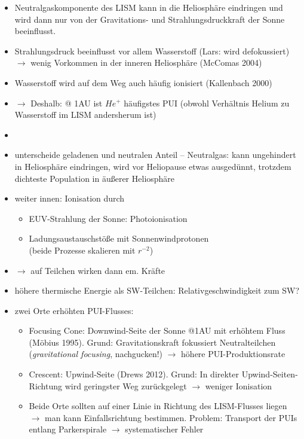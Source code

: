 \documentclass[]{article}
\begin{document}
\begin{itemize}
	\item Neutralgaskomponente des LISM kann in die Heliosphäre eindringen und wird dann nur von der Gravitations- und Strahlungsdruckkraft der Sonne beeinflusst.
	\item Strahlungsdruck beeinflusst vor allem Wasserstoff (Lars: wird defokussiert) $\rightarrow$ wenig Vorkommen in der inneren Heliosphäre (McComas 2004)
	\item Wasserstoff wird auf dem Weg auch häufig ionisiert (Kallenbach 2000)
	\item $\rightarrow$ Deshalb: @ 1AU ist $He^+$ häufigstes PUI (obwohl Verhältnis Helium zu Wasserstoff im LISM andersherum ist)
	\item
	\item unterscheide geladenen und neutralen Anteil -- Neutralgas: kann ungehindert in Heliosphäre eindringen, wird vor Heliopause etwas ausgedünnt, trotzdem dichteste Population in äußerer Heliosphäre
	\item weiter innen: Ionisation durch 
	\begin{itemize}
		\item EUV-Strahlung der Sonne: Photoionisation
		\item Ladungsaustauschstöße mit Sonnenwindprotonen \\
		(beide Prozesse skalieren mit $r^{-2}$)
	\end{itemize}
	\item $\rightarrow$ auf Teilchen wirken dann em. Kräfte
	\item höhere thermische Energie als SW-Teilchen: Relativgeschwindigkeit zum SW?
	\item zwei Orte erhöhten PUI-Flusses:
	\begin{itemize}
		\item Focusing Cone: Downwind-Seite der Sonne @1AU mit erhöhtem Fluss (Möbius 1995). Grund: Gravitationskraft fokussiert Neutralteilchen (\textit{gravitational focusing}, nachgucken!) $\rightarrow$ höhere PUI-Produktionsrate
		\item Crescent: Upwind-Seite (Drews 2012). Grund: In direkter Upwind-Seiten-Richtung wird geringster Weg zurückgelegt $\rightarrow$ weniger Ionisation
		\item Beide Orte sollten auf einer Linie in Richtung des LISM-Flusses liegen $\rightarrow$ man kann Einfallsrichtung bestimmen. Problem: Transport der PUIs entlang Parkerspirale $\rightarrow$ systematischer Fehler 
	\end{itemize}
\end{itemize}
%
%
%
\end{document}
